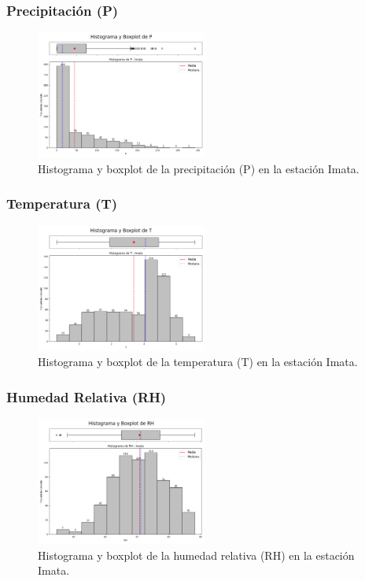 \subsubsection*{Precipitación (P)}
\begin{figure}[H]
\centering
\includegraphics[width=0.5\textwidth]{resultados/por_estacion_meteorologica/Imata/P_histograma.png}
\caption{Histograma y boxplot de la precipitación (P) en la estación Imata.}
\label{fig:imata_P}
\end{figure}

\subsubsection*{Temperatura (T)}
\begin{figure}[H]
\centering
\includegraphics[width=0.5\textwidth]{resultados/por_estacion_meteorologica/Imata/T_histograma.png}
\caption{Histograma y boxplot de la temperatura (T) en la estación Imata.}
\label{fig:imata_T}
\end{figure}

\subsubsection*{Humedad Relativa (RH)}
\begin{figure}[H]
\centering
\includegraphics[width=0.5\textwidth]{resultados/por_estacion_meteorologica/Imata/RH_histograma.png}
\caption{Histograma y boxplot de la humedad relativa (RH) en la estación Imata.}
\label{fig:imata_RH}
\end{figure}


